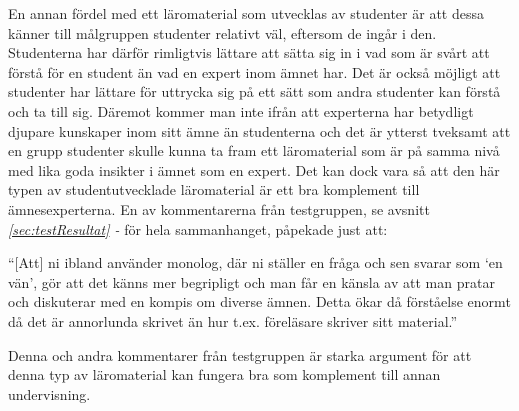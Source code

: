 \documentclass[12pt,a4paper,twoside,openright]{article}
\begin{document}
En annan fördel med ett läromaterial som utvecklas av studenter är att
dessa känner till målgruppen studenter relativt väl, eftersom de ingår
i den. Studenterna har därför rimligtvis lättare att sätta sig in i
vad som är svårt att förstå för en student än vad en expert inom ämnet
har. Det är också möjligt att studenter har lättare för uttrycka sig
på ett sätt som andra studenter kan förstå och ta till sig. Däremot
kommer man inte ifrån att experterna har betydligt djupare kunskaper
inom sitt ämne än studenterna och det är ytterst tveksamt att en grupp
studenter skulle kunna ta fram ett läromaterial som är på samma nivå
med lika goda insikter i ämnet som en expert. Det kan dock vara så att
den här typen av studentutvecklade läromaterial är ett bra komplement
till ämnesexperterna. En av kommentarerna från testgruppen, se avsnitt
\textit{\ref{sec:testResultat} - } för hela
sammanhanget, påpekade just att:

\begin{displayquote}
  ``[Att] ni ibland använder monolog, där ni ställer en fråga och sen
  svarar som `en vän', gör att det känns mer begripligt och man får en
  känsla av att man pratar och diskuterar med en kompis om diverse
  ämnen. Detta ökar då förståelse enormt då det är annorlunda skrivet än
  hur t.ex. föreläsare skriver sitt material.''
\end{displayquote}

Denna och andra kommentarer från testgruppen är starka argument för
att denna typ av läromaterial kan fungera bra som komplement till
annan undervisning.


\end{document}
